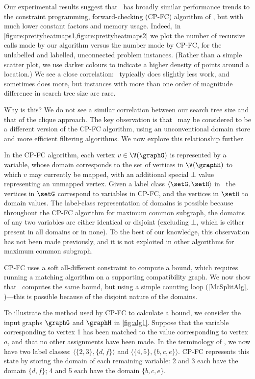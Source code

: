 Our experimental results suggest that \McSplit\ has broadly similar performance
trends to the constraint programming, forward-checking (CP-FC) algorithm of
\citet{DBLP:conf/cp/NdiayeS11}, but with much lower constant factors and memory usage. Indeed,
in \cref{figure:prettyheatmaps1,figure:prettyheatmaps2} we plot the number of
recursive calls made by our algorithm versus the number made by
CP-FC, for the unlabelled and labelled, unconnected problem
instances. (Rather than a simple scatter plot, we use darker colours to
indicate a higher density of points around a location.) We see a close
correlation: \McSplit\ typically does slightly less work, and sometimes does more, but
instances with more than one order of magnitude difference in search tree size
are rare.

Why is this? We do not see a similar correlation between our search tree size
and that of the clique approach. The key observation is that \McSplit\ may be
considered to be a different version of the CP-FC algorithm, using
an unconventional domain store and more efficient filtering algorithms. We now
explore this relationship further.

In the CP-FC algorithm, each vertex $v \in \V(\graphG)$ is represented by a
variable, whose domain corresponds to the set of vertices in $\V(\graphH)$ to
which $v$ may currently be mapped, with an additional special $\bot$ value
representing an unmapped vertex.  Given a label class $\langle \setG,\setH
\rangle$ in \McSplit\, the vertices in $\setG$ correspond to variables in
CP-FC, and the vertices in $\setH$ to domain values. The label-class
representation of domains is possible because throughout the CP-FC algorithm
for maximum common subgraph, the domains of any two variables are either
identical or disjoint (excluding $\bot$, which is either present in all domains or in none).
To the best of our knowledge, this observation has not been made previously,
and it is not exploited in other algorithms for maximum common subgraph.

CP-FC uses a soft all-different constraint to compute a bound, which requires
running a matching algorithm on a supporting compatibility graph.  We now
show that \McSplit\ computes the same bound, but using a simple
counting loop (\cref{McSplitAlg}, )---this is possible
because of the disjoint nature of the domains.

To illustrate the method used by CP-FC to calculate a bound, we consider the
input graphs $\graphG$ and $\graphH$ in \cref{fig:alg1}. Suppose that the
variable corresponding to vertex 1 has been matched to the value corresponding
to vertex $a$, and that no other assignments have been made.  In the
terminology of \McSplit, we now have two label classes: $\langle \{2,3\},
\{d,f\} \rangle$ and $\langle \{4,5\}, \{b,c,e\} \rangle$.  CP-FC represents
this state by storing the domain of each remaining variable: 2 and 3 each
have the domain $\{d,f\}$; 4 and 5 each have the domain $\{b,c,e\}$.

